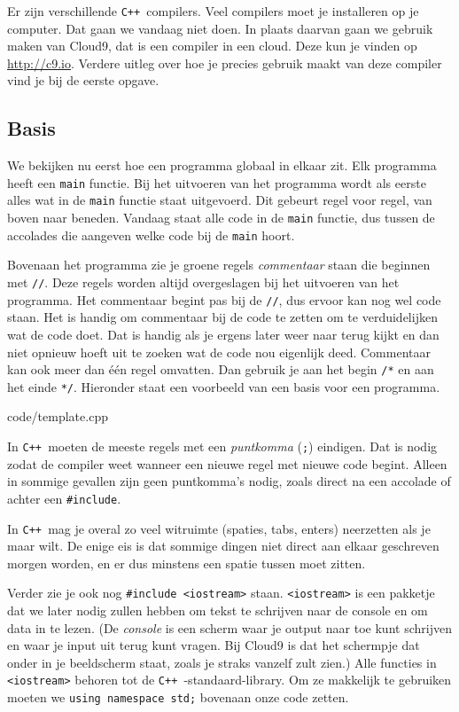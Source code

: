 \documentclass[12pt,a4paper]{article}
\newcommand{\code}{}
\newcommand{\icode}{\lstinline}
\newcommand{\mono}{\texttt}
\newcommand{\cpp}{\mono{C++ }}
\begin{document}
Er zijn verschillende \cpp compilers. Veel compilers moet je installeren op je computer. Dat gaan we vandaag niet doen. In plaats daarvan gaan we gebruik maken van Cloud9, dat is een compiler in een cloud. Deze kun je vinden op \url{http://c9.io}. Verdere uitleg over hoe je precies gebruik maakt van deze compiler vind je bij de eerste opgave.

\subsection{Basis}
We bekijken nu eerst hoe een programma globaal in elkaar zit.  Elk programma heeft een \icode{main} functie. Bij het uitvoeren van het programma wordt als eerste alles wat in de \icode{main} functie staat uitgevoerd. Dit gebeurt regel voor regel, van boven naar beneden. Vandaag staat alle code in de \icode{main} functie, dus tussen de accolades die aangeven welke code bij de \icode{main} hoort.

Bovenaan het programma zie je groene regels \emph{commentaar} staan die beginnen met \icode{//}. Deze regels worden altijd overgeslagen bij het uitvoeren van het programma. Het commentaar begint pas bij de \icode{//}, dus ervoor kan nog wel code staan. Het is handig om commentaar bij de code te zetten om te verduidelijken wat de code doet. Dat is handig als je ergens later weer naar terug kijkt en dan niet opnieuw hoeft uit te zoeken wat de code nou eigenlijk deed. Commentaar kan ook meer dan \'e\'en regel omvatten. Dan gebruik je aan het begin \icode{/*} en aan het einde \icode{*/}. Hieronder staat een voorbeeld van een basis voor een programma. 

\code{code/template.cpp}

In \cpp moeten de meeste regels met een \emph{puntkomma} (\icode{;}) eindigen. Dat is nodig zodat de compiler weet wanneer een nieuwe regel met nieuwe code begint. Alleen in sommige gevallen zijn geen puntkomma's nodig, zoals direct na een accolade of achter een \icode{#include}.

In \cpp  mag je overal zo veel witruimte (spaties, tabs, enters) neerzetten als je maar wilt. De enige eis is dat sommige dingen niet direct aan elkaar geschreven morgen worden, en er dus minstens een spatie tussen moet zitten.

Verder zie je ook nog \icode{#include <iostream>} staan. \icode{<iostream>} is een pakketje dat we later nodig zullen hebben om tekst te schrijven naar de console en om data in te lezen.
(De \emph{console} is een scherm waar je output naar toe kunt schrijven en waar je input uit terug kunt vragen. Bij Cloud9 is dat het schermpje dat onder in je beeldscherm staat, zoals je straks vanzelf zult zien.)
Alle functies in \icode{<iostream>} behoren tot de \cpp-standaard-library. Om ze makkelijk te gebruiken moeten we \icode{using namespace std;} bovenaan onze code zetten.
\end{document}
